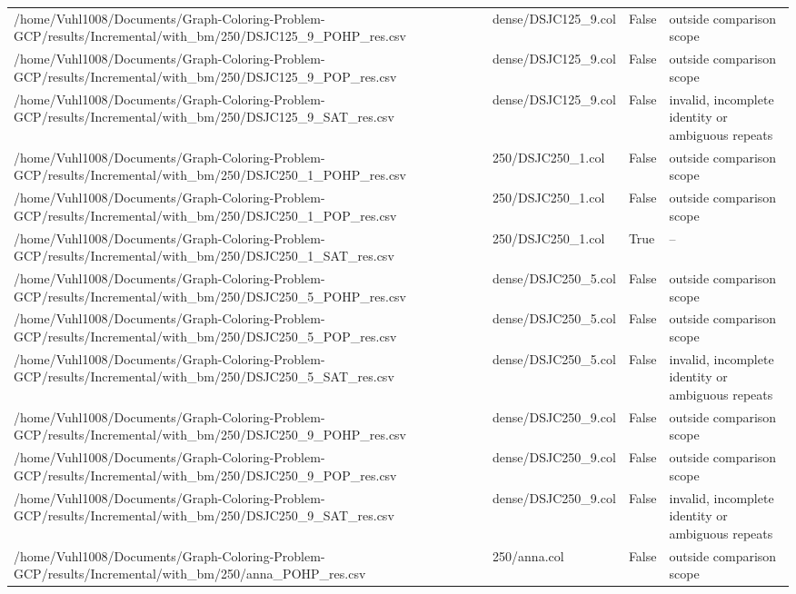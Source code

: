 \begin{table}[htbp]
\begin{tabular}{llll}
/home/Vuhl1008/Documents/Graph-Coloring-Problem-GCP/results/Incremental/with\_bm/250/DSJC125\_9\_POHP\_res.csv & dense/DSJC125\_9.col & False & outside comparison scope \\
/home/Vuhl1008/Documents/Graph-Coloring-Problem-GCP/results/Incremental/with\_bm/250/DSJC125\_9\_POP\_res.csv & dense/DSJC125\_9.col & False & outside comparison scope \\
/home/Vuhl1008/Documents/Graph-Coloring-Problem-GCP/results/Incremental/with\_bm/250/DSJC125\_9\_SAT\_res.csv & dense/DSJC125\_9.col & False & invalid, incomplete identity or ambiguous repeats \\
/home/Vuhl1008/Documents/Graph-Coloring-Problem-GCP/results/Incremental/with\_bm/250/DSJC250\_1\_POHP\_res.csv & 250/DSJC250\_1.col & False & outside comparison scope \\
/home/Vuhl1008/Documents/Graph-Coloring-Problem-GCP/results/Incremental/with\_bm/250/DSJC250\_1\_POP\_res.csv & 250/DSJC250\_1.col & False & outside comparison scope \\
/home/Vuhl1008/Documents/Graph-Coloring-Problem-GCP/results/Incremental/with\_bm/250/DSJC250\_1\_SAT\_res.csv & 250/DSJC250\_1.col & True & -- \\
/home/Vuhl1008/Documents/Graph-Coloring-Problem-GCP/results/Incremental/with\_bm/250/DSJC250\_5\_POHP\_res.csv & dense/DSJC250\_5.col & False & outside comparison scope \\
/home/Vuhl1008/Documents/Graph-Coloring-Problem-GCP/results/Incremental/with\_bm/250/DSJC250\_5\_POP\_res.csv & dense/DSJC250\_5.col & False & outside comparison scope \\
/home/Vuhl1008/Documents/Graph-Coloring-Problem-GCP/results/Incremental/with\_bm/250/DSJC250\_5\_SAT\_res.csv & dense/DSJC250\_5.col & False & invalid, incomplete identity or ambiguous repeats \\
/home/Vuhl1008/Documents/Graph-Coloring-Problem-GCP/results/Incremental/with\_bm/250/DSJC250\_9\_POHP\_res.csv & dense/DSJC250\_9.col & False & outside comparison scope \\
/home/Vuhl1008/Documents/Graph-Coloring-Problem-GCP/results/Incremental/with\_bm/250/DSJC250\_9\_POP\_res.csv & dense/DSJC250\_9.col & False & outside comparison scope \\
/home/Vuhl1008/Documents/Graph-Coloring-Problem-GCP/results/Incremental/with\_bm/250/DSJC250\_9\_SAT\_res.csv & dense/DSJC250\_9.col & False & invalid, incomplete identity or ambiguous repeats \\
/home/Vuhl1008/Documents/Graph-Coloring-Problem-GCP/results/Incremental/with\_bm/250/anna\_POHP\_res.csv & 250/anna.col & False & outside comparison scope \\

\end{tabular}
\end{table}
